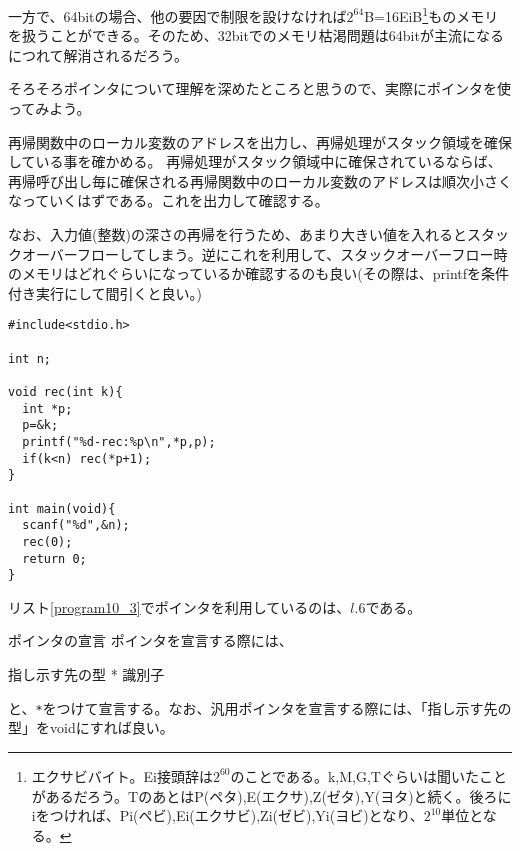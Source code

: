 一方で、64bitの場合、他の要因で制限を設けなければ$2^{64}$B=16EiB\footnote{エクサビバイト。Ei接頭辞は$2^{60}$のことである。k,M,G,Tぐらいは聞いたことがあるだろう。TのあとはP(ペタ),E(エクサ),Z(ゼタ),Y(ヨタ)と続く。後ろにiをつければ、Pi(ペビ),Ei(エクサビ),Zi(ゼビ),Yi(ヨビ)となり、$2^{10}$単位となる。}ものメモリを扱うことができる。そのため、32bitでのメモリ枯渇問題は64bitが主流になるにつれて解消されるだろう。

そろそろポインタについて理解を深めたところと思うので、実際にポインタを使ってみよう。
\begin{boxnote}
\begin{multicols}{2}
再帰関数中のローカル変数のアドレスを出力し、再帰処理がスタック領域を確保している事を確かめる。
再帰処理がスタック領域中に確保されているならば、再帰呼び出し毎に確保される再帰関数中のローカル変数のアドレスは順次小さくなっていくはずである。これを出力して確認する。

なお、入力値(整数)の深さの再帰を行うため、あまり大きい値を入れるとスタックオーバーフローしてしまう。逆にこれを利用して、スタックオーバーフロー時のメモリはどれぐらいになっているか確認するのも良い(その際は、printfを条件付き実行にして間引くと良い。)

\begin{lstlisting}[caption=再帰のメモリ確保,label=program10_3]
#include<stdio.h>

int n;

void rec(int k){
  int *p;
  p=&k;
  printf("%d-rec:%p\n",*p,p);
  if(k<n) rec(*p+1);
}

int main(void){
  scanf("%d",&n);
  rec(0);
  return 0;
}
\end{lstlisting}
\end{multicols}
\end{boxnote}
リスト\ref{program10_3}でポインタを利用しているのは、$l$.6である。
\begin{itembox}[l]{ポインタの宣言}
ポインタを宣言する際には、
\begin{code}
指し示す先の型 * 識別子
\end{code}
と、\verb|*|をつけて宣言する。なお、汎用ポインタを宣言する際には、「指し示す先の型」をvoidにすれば良い。
\end{itembox}

